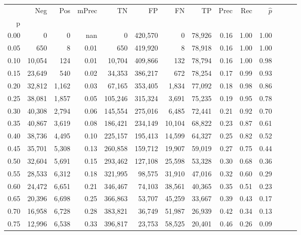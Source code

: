 \begin{tabular}{rrrrrrrrrrrrrr}
\toprule
{} &     Neg &    Pos & mPrec &       TN &       FP &      FN &      TP &  Prec &   Rec & $\hat{p}$ \\
p    &         &        &       &          &          &         &         &       &       &           \\
\midrule
0.00 &       0 &      0 &   nan &        0 &  420,570 &       0 &  78,926 &  0.16 &  1.00 &      1.00 \\
0.05 &     650 &      8 &  0.01 &      650 &  419,920 &       8 &  78,918 &  0.16 &  1.00 &      1.00 \\
0.10 &  10,054 &    124 &  0.01 &   10,704 &  409,866 &     132 &  78,794 &  0.16 &  1.00 &      0.98 \\
0.15 &  23,649 &    540 &  0.02 &   34,353 &  386,217 &     672 &  78,254 &  0.17 &  0.99 &      0.93 \\
0.20 &  32,812 &  1,162 &  0.03 &   67,165 &  353,405 &   1,834 &  77,092 &  0.18 &  0.98 &      0.86 \\
0.25 &  38,081 &  1,857 &  0.05 &  105,246 &  315,324 &   3,691 &  75,235 &  0.19 &  0.95 &      0.78 \\
0.30 &  40,308 &  2,794 &  0.06 &  145,554 &  275,016 &   6,485 &  72,441 &  0.21 &  0.92 &      0.70 \\
0.35 &  40,867 &  3,619 &  0.08 &  186,421 &  234,149 &  10,104 &  68,822 &  0.23 &  0.87 &      0.61 \\
0.40 &  38,736 &  4,495 &  0.10 &  225,157 &  195,413 &  14,599 &  64,327 &  0.25 &  0.82 &      0.52 \\
0.45 &  35,701 &  5,308 &  0.13 &  260,858 &  159,712 &  19,907 &  59,019 &  0.27 &  0.75 &      0.44 \\
0.50 &  32,604 &  5,691 &  0.15 &  293,462 &  127,108 &  25,598 &  53,328 &  0.30 &  0.68 &      0.36 \\
0.55 &  28,533 &  6,312 &  0.18 &  321,995 &   98,575 &  31,910 &  47,016 &  0.32 &  0.60 &      0.29 \\
0.60 &  24,472 &  6,651 &  0.21 &  346,467 &   74,103 &  38,561 &  40,365 &  0.35 &  0.51 &      0.23 \\
0.65 &  20,396 &  6,698 &  0.25 &  366,863 &   53,707 &  45,259 &  33,667 &  0.39 &  0.43 &      0.17 \\
0.70 &  16,958 &  6,728 &  0.28 &  383,821 &   36,749 &  51,987 &  26,939 &  0.42 &  0.34 &      0.13 \\
0.75 &  12,996 &  6,538 &  0.33 &  396,817 &   23,753 &  58,525 &  20,401 &  0.46 &  0.26 &      0.09 \\

\end{tabular}
